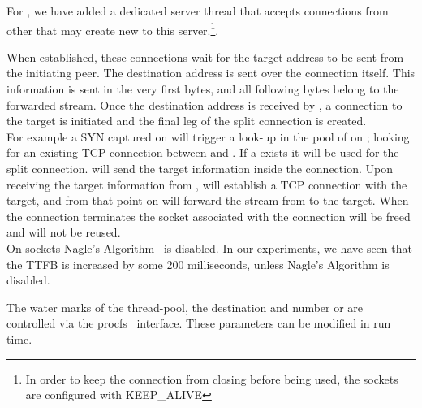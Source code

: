 For \reconns, we have added a dedicated server thread that accepts connections from other \relays that may create new \reconns to this server.\footnote{In order to keep the connection from closing before being used, the sockets are configured with KEEP\_ALIVE}.

When established, these connections wait for the target address to be sent from the initiating peer. The destination address is sent over the connection itself. This information is sent in the very first bytes, and all following bytes belong to the forwarded stream. 
Once the destination address is received by \rs , a connection to the target is initiated and the final leg of the split connection is created.\\ 
For example a SYN captured on \rc will trigger a look-up in the pool of \reconns on \rc; looking for an existing TCP connection between \rc and \rs. If a \reconn exists it will be used for the split connection. \rc will send the target information inside the connection. Upon receiving the target information from \rc, \rs will establish a TCP connection with the target, and from that point on \rs will forward the stream from \rc to the target. When the connection terminates the socket associated with the connection will be freed and will not be reused.\\ 
 On \reconn sockets Nagle's Algorithm~\cite{nagle} is disabled. In our experiments, we have seen that the TTFB is increased by some $200$ milliseconds, unless Nagle's Algorithm is disabled.  

 The water marks of the thread-pool, the destination and number or \reconn are controlled via the procfs~\cite{proc} interface. These parameters can be modified in run time.


